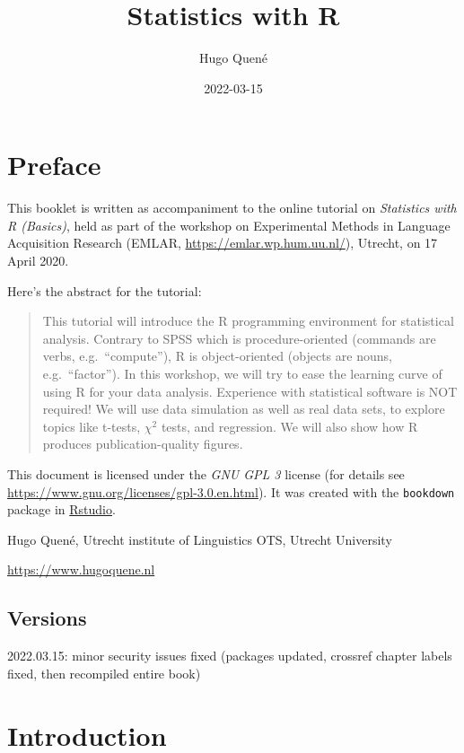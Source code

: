 \documentclass[
]{book}
\title{Statistics with R}
\author{Hugo Quené}
\date{2022-03-15}
\begin{document}
\maketitle

{
\setcounter{tocdepth}{1}
\tableofcontents
}
\hypertarget{preface}{%
\chapter*{Preface}\label{preface}}

This booklet is written as accompaniment to the online tutorial on \emph{Statistics with R (Basics)}, held as part of the workshop on Experimental Methods in Language Acquisition Research (EMLAR, \url{https://emlar.wp.hum.uu.nl/}), Utrecht, on 17 April 2020.

Here's the abstract for the tutorial:

\begin{quote}
This tutorial will introduce the R programming environment for statistical analysis. Contrary to SPSS which is procedure-oriented (commands are verbs, e.g.~``compute''), R is object-oriented (objects are nouns, e.g.~``factor''). In this workshop, we will try to ease the learning curve of using R for your data analysis. Experience with statistical software is NOT required! We will use data simulation as well as real data sets, to explore topics like t-tests, \(\chi^2\) tests, and regression. We will also show how R produces publication-quality figures.
\end{quote}

This document is licensed under the \emph{GNU GPL 3} license (for details see
\url{https://www.gnu.org/licenses/gpl-3.0.en.html}). It was created with the \texttt{bookdown} package \citep{R-bookdown} in \href{https://www.rstudio.com}{Rstudio}.

Hugo Quené, Utrecht institute of Linguistics OTS, Utrecht University

\url{https://www.hugoquene.nl}

\hypertarget{versions}{%
\section*{Versions}\label{versions}}

2022.03.15: minor security issues fixed (packages updated, crossref chapter labels fixed, then recompiled entire book)

\hypertarget{ch-introduction}{%
\chapter{Introduction}\label{ch-introduction}}
\end{document}
